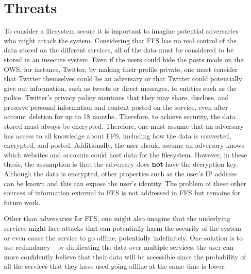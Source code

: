 \section{Threats}
\label{sec:introTreats}
To consider a filesystem secure it is important to imagine potential adversaries who might attack the system. Considering that \gls{FFS} has no real control of the data stored on the different services, all of the data must be considered to be stored in an insecure system. Even if the users could hide the posts made on the \gls{OWS}, for instance, Twitter, by making their profile private, one must consider that Twitter themselves could be an adversary or that Twitter could potentially give out information, such as tweets or direct messages, to entities such as the police. Twitter's privacy policy mentions that they may share, disclose, and preserve personal information and content posted on the service, even after account deletion for up to \num{18} months\,\cite{TwitterPrivacyPolicy}. Therefore, to achieve security, the data stored must always be encrypted. Therefore, one must assume that an adversary has access to all knowledge about \gls{FFS}, including how the data is converted, encrypted, and posted. Additionally, the user should assume an adversary knows which websites and accounts could host data for the filesystem. However, in these thesis, the assumption is that the adversary does \textbf{not} have the decryption key. Although the data is encrypted, other properties such as the user's IP address can be known and this can expose the user's identity. The problem of these other sources of information external to \gls{FFS} is not addressed in \gls{FFS} but remains for future work.

Other than adversaries for \gls{FFS}, one might also imagine that the underlying services might face attacks that can potentially harm the security of the system or even cause the service to go offline, potentially indefinitely. One solution is to use redundancy - by duplicating the data over multiple services, the user can more confidently believe that their data will be accessible since the probability of all the services that they have used going offline at the same time is lower.

